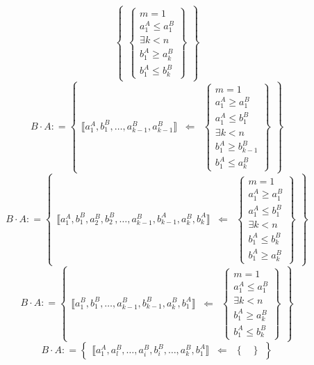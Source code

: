 \begin{enumerate}
\[\begin{Bmatrix}
\begin{Bmatrix}
  {m = 1} \\
  {a_{1}^{A} \leq a_{1}^{B}} \\
  {\exists{k < n}} \\
  {b_{1}^{A} \geq a_{k}^{B}} \\
  {b_{1}^{A} \leq b_{k}^{B}}
  \end{Bmatrix}
  \end{Bmatrix}\]\[{{B \cdot A}{: =}}\begin{Bmatrix}
  {⟦{{a_{1}^{A},b_{1}^{B}},\ldots,{a_{k - 1}^{B},a_{k - 1}^{B}}}⟧} & {\Leftarrow} & \begin{Bmatrix}
  {m = 1} \\
  {a_{1}^{A} \geq a_{1}^{B}} \\
  {a_{1}^{A} \leq b_{1}^{B}} \\
  {\exists{k < n}} \\
  {b_{1}^{A} \geq b_{k - 1}^{B}} \\
  {b_{1}^{A} \leq a_{k}^{B}}
  \end{Bmatrix}
  \end{Bmatrix}\]\[{{B \cdot A}{: =}}\begin{Bmatrix}
  {⟦{{a_{1}^{A},b_{1}^{B}},{a_{2}^{B},b_{2}^{B}},\ldots,{a_{k - 1}^{B},b_{k - 1}^{A}},{a_{k}^{B},b_{k}^{A}}}⟧} & \Leftarrow & \begin{Bmatrix}
  {m = 1} \\
  {a_{1}^{A} \geq a_{1}^{B}} \\
  {a_{1}^{A} \leq b_{1}^{B}} \\
  {\exists{k < n}} \\
  {b_{1}^{A} \leq b_{k}^{B}} \\
  {b_{1}^{A} \geq a_{k}^{B}}
  \end{Bmatrix}
  \end{Bmatrix}\]\[{{B \cdot A}{: =}}\begin{Bmatrix}
  {⟦{{a_{1}^{B},b_{1}^{B}},\ldots,{a_{k - 1}^{B},b_{k - 1}^{B}},{a_{k}^{B},b_{1}^{A}}}⟧} & \Leftarrow & \begin{Bmatrix}
  {m = 1} \\
  {a_{1}^{A} \leq a_{1}^{B}} \\
  {\exists{k < n}} \\
  {b_{1}^{A} \geq a_{k}^{B}} \\
  {b_{1}^{A} \leq b_{k}^{B}}
  \end{Bmatrix}
  \end{Bmatrix}\]\[{{B \cdot A}{: =}}\begin{Bmatrix}
  {⟦{{a_{1}^{A},a_{l}^{B}},\ldots,{a_{i}^{B},b_{i}^{B}},\ldots,{a_{k}^{B},b_{1}^{A}}}⟧} & \Leftarrow & \begin{Bmatrix}

\end{Bmatrix}
\end{Bmatrix}\]
\end{enumerate}
